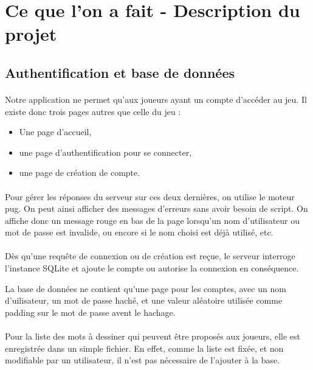 \documentclass[11pt,a4paper]{article}
\begin{document}
    \section{Ce que l'on a fait - Description du projet}
        \subsection{Authentification et base de données}
            \paragraph{}
            Notre application ne permet qu'aux joueurs ayant un compte d'accéder au jeu.
            Il existe donc trois pages autres que celle du jeu :
            \begin{itemize}
                \item Une page d'accueil,
                \item une page d'authentification pour se connecter,
                \item une page de création de compte.
            \end{itemize}
            \paragraph{}
            Pour gérer les réponses du serveur sur ces deux dernières,
            on utilise le moteur pug.
            On peut ainsi afficher des messages d'erreurs sans avoir besoin de script.
            On affiche donc un message rouge en bas de la page lorsqu'un nom d'utilisateur ou mot de passe est invalide,
            ou encore si le nom choisi est déjà utilisé, etc.
            \paragraph{}
            Dès qu'une requête de connexion ou de création est reçue,
            le serveur interroge l'instance SQLite et ajoute le compte ou autorise la connexion en conséquence.

            La base de données ne contient qu'une page pour les comptes, avec un nom d'uilisateur, un mot de passe haché,
            et une valeur aléatoire utilisée comme padding sur le mot de passe avent le hachage.
            \paragraph{}
            Pour la liste des mots à dessiner qui peuvent être proposés aux joueurs,
            elle est enregistrée dans un simple fichier.
            En effet, comme la liste est fixée, et non modifiable par un utilisateur,
            il n'est pas nécessaire de l'ajouter à la base.
\end{document}
